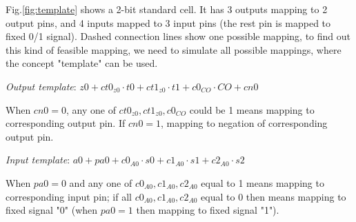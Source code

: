 Fig.\ref{fig:template} shows a 2-bit standard cell. It has 3 outputs mapping to 2 output pins,
and 4 inputs mapped to 3 input pins (the rest pin is mapped to fixed 0/1 signal). Dashed connection
lines show one possible mapping, to find out this kind of feasible mapping, we need to simulate
all possible mappings, where the concept "template" can be used.\vspace{5mm}

{\it Output template}: $z0+ct0_{z0}\cdot t0+ct1_{z0}\cdot t1+c0_{CO}\cdot CO+cn0$

When $cn0 = 0$, any one of $ct0_{z0},ct1_{z0},c0_{CO}$ could be 1 means mapping to corresponding output
pin. If $cn0 = 1$, mapping to negation of corresponding output pin.

{\it Input template}: $a0+pa0+c0_{A0}\cdot s0+c1_{A0}\cdot s1+c2_{A0}\cdot s2$

When $pa0 = 0$ and any one of $c0_{A0},c1_{A0},c2_{A0}$ equal to 1 means mapping to corresponding input
pin; if all $c0_{A0},c1_{A0},c2_{A0}$ equal to 0 then means mapping to fixed signal "0" (when $pa0 = 1$ then
mapping to fixed signal "1").